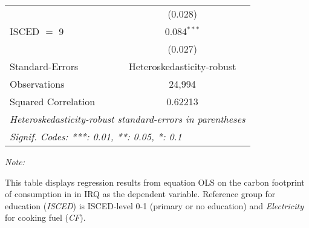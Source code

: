 \begin{table}[htbp!]
\begin{adjustbox}{width = 1\textwidth, max height = 0.95\textheight, center}
\begin{threeparttable}[b]
\begin{tabular}{lc}
                                & (0.028)\\   
            ISCED $=$ 9         & 0.084$^{***}$\\   
                                & (0.027)\\   
            \midrule 
            Standard-Errors     & Heteroskedasticity-robust \\   
            Observations        & 24,994\\  
            Squared Correlation & 0.62213\\  
            \midrule \midrule
            \multicolumn{2}{l}{\emph{Heteroskedasticity-robust standard-errors in parentheses}}\\
            \multicolumn{2}{l}{\emph{Signif. Codes: ***: 0.01, **: 0.05, *: 0.1}}\\
         \end{tabular}
         
         \begin{tablenotes}\item \medskip \textit{Note:}
            \item This table displays regression results from equation OLS on the carbon footprint of consumption in  in IRQ as the dependent variable.  Reference group for education (\textit{ISCED}) is ISCED-level 0-1 (primary or no education) and \textit{Electricity} for cooking fuel (\textit{CF}).
         \end{tablenotes}
      \end{threeparttable}
   \end{adjustbox}
\end{table}



